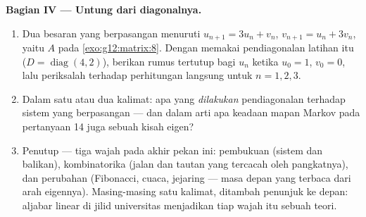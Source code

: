 \begin{problem}
\medskip
\noindent\textbf{Bagian IV --- Untung dari diagonalnya.}
\begin{enumerate}[resume]
  \item Dua besaran yang berpasangan menuruti
        $u_{n+1} = 3u_n + v_n$, $v_{n+1} = u_n + 3v_n$, yaitu
         $A$ pada \cref{exo:g12:matrix:8}. Dengan memakai
        pendiagonalan latihan itu
        ($D = \operatorname{diag}(4, 2)$), berikan rumus
        tertutup bagi $u_n$ ketika $u_0 = 1$, $v_0 = 0$, lalu periksalah
        terhadap perhitungan langsung untuk $n = 1, 2, 3$.
  \item Dalam satu atau dua kalimat: apa yang \emph{dilakukan} pendiagonalan
        terhadap sistem yang berpasangan --- dan dalam arti apa
        keadaan mapan Markov pada pertanyaan 14 juga sebuah kisah 
        eigen?
  \item Penutup --- tiga wajah  pada akhir pekan ini:
        pembukuan (sistem dan balikan), kombinatorika
        (jalan dan tautan yang tercacah oleh pangkatnya), dan perubahan
        (Fibonacci, cuaca, jejaring --- masa depan yang terbaca dari
        arah eigennya). Masing-masing satu kalimat, ditambah
        penunjuk ke depan: aljabar linear di jilid universitas
        menjadikan tiap wajah itu sebuah teori.

\end{enumerate}
\end{problem}
